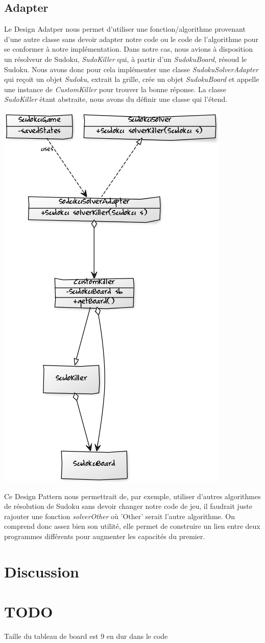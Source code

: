 \documentclass[a4paper]{article}
\begin{document}
\subsection{Adapter}
Le Design Adatper nous permet d'utiliser une fonction/algorithme provenant d'une autre classe sans devoir adapter notre code ou le code de l'algorithme pour se conformer à notre implémentation.
Dans notre cas, nous avions à disposition un résolveur de Sudoku, \textit{SudoKiller} qui, à partir d'un \textit{SudokuBoard}, résoud le Sudoku.
Nous avons donc pour cela implémenter une classe \textit{SudokuSolverAdapter} qui reçoit un objet \textit{Sudoku}, extrait la grille, crée un objet \textit{SudokuBoard} et appelle une instance de \textit{CustomKiller} pour trouver la bonne réponse.
La classe \textit{SudoKiller} étant abstraite, nous avons du définir une classe qui l'étend.
\begin{center}
\includegraphics[scale=0.7]{../diagrams/adapter.png}
\end{center}
Ce Design Pattern nous permettrait de, par exemple, utiliser d'autres algorithmes de résolution de Sudoku sans devoir changer notre code de jeu, il faudrait juste rajouter une fonction \textit{solverOther} où 'Other' serait l'autre algorithme.
On comprend donc assez bien son utilité, elle permet de construire un lien entre deux programmes différents pour augmenter les capacités du premier.
\newpage
\section{Discussion}

\section{TODO}
Taille du tableau de board est 9 en dur dans le code
\end{document}
